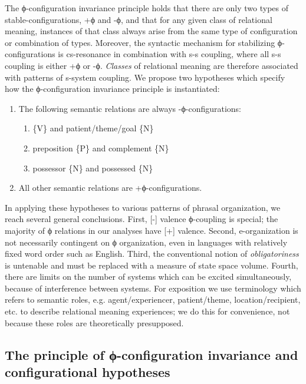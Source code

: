   The ϕ-configuration invariance principle holds that there are only two types of stable-configurations, +ϕ and -ϕ, and that for any given class of relational meaning, instances of that class always arise from the same type of configuration or combination of types. Moreover, the syntactic mechanism for stabilizing ϕ-configurations is cs-resonance in combination with s-s coupling, where all s-s coupling is either +ϕ or -ϕ. \textit{Classes} of relational meaning are therefore associated with patterns of s-system coupling. We propose two hypotheses which specify how the ϕ-configuration invariance principle is instantiated:
  
\begin{enumerate}
\item The following semantic relations are always -ϕ-configurations:
\begin{enumerate}
  \item \{V\} and patient/theme/goal \{N\}
  \item preposition \{P\} and complement \{N\}
  \item possessor \{N\} and possessed \{N\}
\end{enumerate}
\item  All other semantic relations are +ϕ-configurations.
\end{enumerate}

  In applying these hypotheses to various patterns of phrasal organization, we reach several general conclusions. First, [-] valence ϕ-coupling is special; the majority of ϕ relations in our analyses have [+] valence. Second, e-organization is not necessarily contingent on ϕ organization, even in languages with relatively fixed word order such as English. Third, the conventional notion of \textit{obligatoriness} is untenable and must be replaced with a measure of state space volume. Fourth, there are limits on the number of systems which can be excited simultaneously, because of interference between systems. For exposition we use terminology which refers to semantic roles, e.g. agent/experiencer, patient/theme, location/recipient, etc. to describe relational meaning experiences; we do this for convenience, not because these roles are theoretically presupposed.

\subsection{The principle of \textup{ϕ-configuration} invariance and configurational hypotheses}

